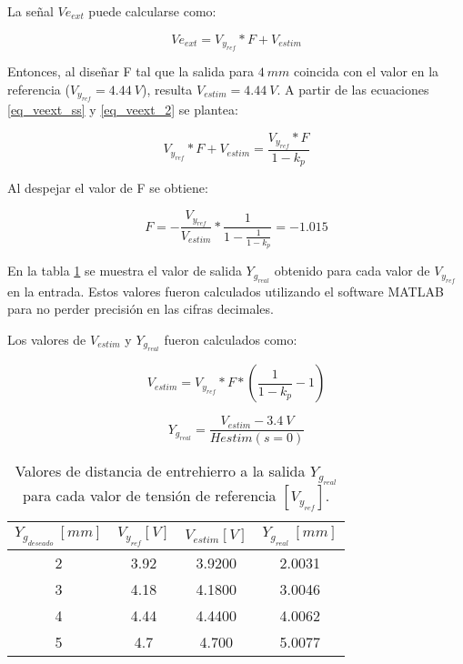 La señal $Ve_{ext}$ puede calcularse como:

\begin{equation} \label{eq_veext_2}
	Ve_{ext}=V_{y_{ref}}*F+V_{estim}
\end{equation}

Entonces, al diseñar F tal que la salida para $4\:mm$ coincida con el valor en la referencia ($V_{y_{ref}}=4.44\:V$), resulta  $V_{estim}=4.44\:V$. A partir de las ecuaciones \ref{eq_veext_ss} y \ref{eq_veext_2} se plantea:

\begin{equation}
	V_{y_{ref}}*F+V_{estim}=\frac{V_{y_{ref}}*F}{1-k_p}
\end{equation}

Al despejar el valor de F se obtiene:

\begin{equation}
	F=-\frac{V_{y_{ref}}}{V_{estim}}*\frac{1}{1-\frac{1}{1-k_p}}=-1.015
\end{equation}


En la tabla \ref{tension-ref-vs-separacion-real} se muestra el valor de salida $Y_{g_{real}}$ obtenido para cada valor de $V_{y_{ref}}$ en la entrada. Estos valores fueron calculados utilizando el software MATLAB para no perder precisión en las cifras decimales.

Los valores de $V_{estim}$ y $Y_{g_{real}}$ fueron calculados como:

\begin{equation}
	V_{estim}=V_{y_{ref}}*F*(\frac{1}{1-k_p}-1)
\end{equation}

\begin{equation}
	Y_{g_{real}}=\frac{V_{estim}-3.4\:V}{H{estim}(s=0)}
\end{equation}

\begin{table}[H]
	\begin{center}
		\begin{tabular}{| c | c | c | c |}
			\hline
			$Y_{g_{deseado}}\:[mm]$ & $V_{y_{ref}}[V]$& $V_{estim}[V]$& $Y_{g_{real}}\:[mm]$\\ \hline
			2 &	3.92 & 3.9200 & 2.0031 \\ \hline
			3 & 4.18 & 4.1800 & 3.0046\\ \hline
			4 & 4.44 & 4.4400 & 4.0062 \\ \hline
			5 & 4.7 & 4.700 & 5.0077\\ \hline	
		\end{tabular}
		\caption{Valores de distancia de entrehierro a la salida $Y_{g_{real}}$ para cada valor de tensión de referencia $[V_{y_{ref}}]$.}
		\label{tension-ref-vs-separacion-real}
	\end{center}
\end{table}

